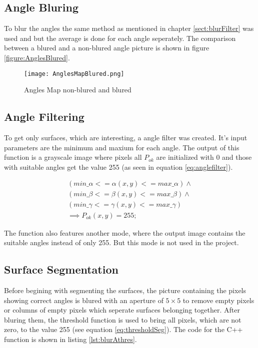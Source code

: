 \subsection{Angle Bluring}

To blur the angles the same method as mentioned in chapter \vref{sect:blurFilter} was used and
but the average is done for each angle seperately. The comparison between a blured and a non-blured
angle picture is shown in figure \vref{figure:AnglesBlured}.

\begin{figure}[H]
\begin{center}
  \texttt{[image: AnglesMapBlured.png]}
  \caption{Angles Map non-blured and blured}
  \label{figure:AnglesBlured}
\end{center}
\end{figure}


\subsection{Angle Filtering}

To get only surfaces, which are interesting, a angle filter was created. It's input parameters
are the minimum and maxium for each angle. The output of this function is a grayscale image
where pixels all $P_{ok}$ are initialized with 0 and those with suitable angles get the value 255
(as seen in equation \vref{eq:anglefilter}).

\begin{gather}
(min\_\alpha  <= \alpha(x,y) <=max\_\alpha ) \wedge \nonumber\\ 
(min\_\beta  <= \beta(x,y) <=max\_\beta )\wedge\nonumber\\
(min\_\gamma  <= \gamma(x,y) <=max\_\gamma )\nonumber\\
\implies P_{ok}(x,y) = 255;
\label{eq:anglefilter}
\end{gather}

The function also features another mode, where the output image contains the suitable angles instead of only 255.
But this mode is not used in the project. 

\subsection{Surface Segmentation}

Before begining with segmenting the surfaces, the picture containing the pixels showing 
correct angles is blured with an aperture of $5 \times 5$ to remove empty pixels or columns of empty pixels 
which seperate surfaces belonging together. After bluring them, the threshold function is used to bring 
all pixels, which are not zero, to the value 255 (see equation \vref{eq:thresholdSeg}).
The code for the C++ function is shown in listing \vref{lst:blurAthres}.


